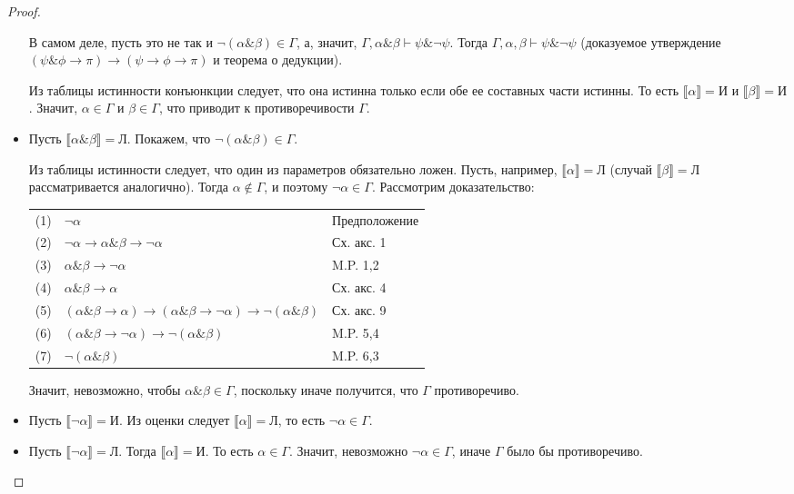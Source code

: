 \begin{proof}
\begin{itemize}
В самом деле, пусть это не так и $\neg (\alpha\&\beta) \in \Gamma$,
а, значит, $\Gamma, \alpha \& \beta \vdash \psi \& \neg \psi$.
Тогда $\Gamma, \alpha, \beta \vdash \psi \& \neg \psi$ (доказуемое 
утверждение $(\psi \& \phi \rightarrow \pi) \rightarrow (\psi \rightarrow \phi \rightarrow \pi)$ 
и теорема о дедукции).

Из таблицы истинности конъюнкции следует, что она истинна только если обе ее составных 
части истинны. То есть
$\llbracket \alpha \rrbracket = \texttt{И}$ и $\llbracket \beta \rrbracket = \texttt{И}$.
Значит, $\alpha \in \Gamma$ и $\beta \in \Gamma$, что приводит к противоречивости $\Gamma$.

\item Пусть $\llbracket \alpha \& \beta \rrbracket = \texttt{Л}$.
Покажем, что $\neg(\alpha \& \beta) \in \Gamma$.

Из таблицы истинности следует, что один из параметров обязательно ложен. 
Пусть, например, $\llbracket \alpha \rrbracket = \texttt{Л}$ (случай 
$\llbracket \beta \rrbracket = \texttt{Л}$ рассматривается аналогично). 
Тогда $\alpha \notin \Gamma$, и поэтому $\neg\alpha \in \Gamma$.
Рассмотрим доказательство:

\begin{tabular}{lll}
(1) & $\neg\alpha$ & Предположение\\
(2) & $\neg\alpha \rightarrow \alpha\&\beta\rightarrow\neg\alpha$ & Сх. акс. 1\\
(3) & $\alpha\&\beta \rightarrow \neg\alpha$ & M.P. 1,2\\
(4) & $\alpha \& \beta \rightarrow \alpha$ & Сх. акс. 4\\
(5) & $(\alpha \& \beta \rightarrow \alpha) \rightarrow (\alpha \& \beta \rightarrow \neg\alpha) \rightarrow \neg(\alpha \& \beta)$ & Сх. акс. 9\\
(6) & $(\alpha \& \beta \rightarrow \neg\alpha) \rightarrow \neg(\alpha \& \beta)$ & M.P. 5,4\\
(7) & $\neg(\alpha \& \beta)$ & M.P. 6,3
\end{tabular}

Значит, невозможно, чтобы $\alpha\&\beta \in \Gamma$, поскольку иначе
получится, что $\Gamma$ противоречиво.

\item Пусть $\llbracket \neg\alpha \rrbracket = \texttt{И}$. Из оценки следует 
$\llbracket \alpha \rrbracket = \texttt{Л}$, то есть $\neg\alpha \in \Gamma$. 

\item Пусть $\llbracket \neg\alpha \rrbracket = \texttt{Л}$. Тогда $\llbracket \alpha \rrbracket = \texttt{И}$.
То есть $\alpha \in \Gamma$. Значит, невозможно $\neg\alpha \in \Gamma$, иначе $\Gamma$
было бы противоречиво.

\end{itemize}

\end{proof}

